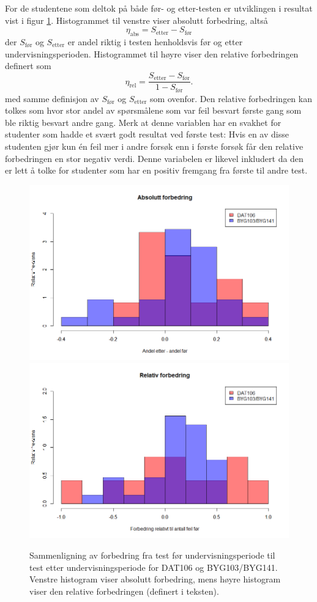 \documentclass[a4paper,norsk,12pt]{article}
\begin{document}
For de studentene som deltok på både før- og etter-testen er utviklingen i resultat vist i figur \ref{fig:forbedring}. Histogrammet til venstre viser absolutt forbedring, altså 
\begin{displaymath}
	\eta_\text{abs} = S_\text{etter}-S_\text{før}
\end{displaymath}
der $S_\text{før}$ og $S_\text{etter}$ er andel riktig i testen henholdsvis før og etter undervisningsperioden. Histogrammet til høyre viser den relative forbedringen definert som
\begin{displaymath}
	\eta_\text{rel} = \frac{S_\text{etter}-S_\text{før}}{1 - S_\text{før}}.
\end{displaymath}
med samme definisjon av $S_\text{før}$ og $S_\text{etter}$ som ovenfor. Den relative forbedringen kan tolkes som hvor stor andel av spørsmålene som var feil besvart første gang som ble riktig besvart andre gang. Merk at denne variablen har en svakhet for studenter som hadde et svært godt resultat ved første test: Hvis en av disse studenten gjør kun \'en feil mer i andre forsøk enn i første forsøk får den relative forbedringen en stor negativ verdi. Denne variabelen er likevel inkludert da den er lett å tolke for studenter som har en positiv fremgang fra første til andre test.
\begin{figure}[tp]
	\includegraphics[width=.48\textwidth]{./absForbedring}
	\includegraphics[width=.48\textwidth]{./relForbedring}
	\caption{Sammenligning av forbedring fra test før undervisningsperiode til test etter undervisningsperiode for DAT106 og BYG103/BYG141. Venstre histogram viser absolutt forbedring, mens høyre histogram viser den relative forbedringen (definert i teksten). }
	\label{fig:forbedring}
\end{figure}
\end{document}
